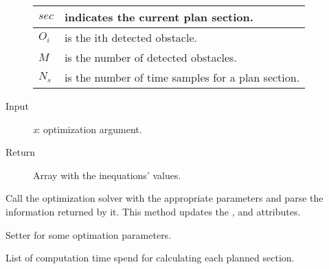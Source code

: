 \documentclass[letterpaper,10pt,english]{sphinxmanual}
\begin{document}
\begin{fulllineitems}
\begin{fulllineitems}
\begin{description}
\begin{tabulary}{\linewidth}{|L|L|}
\(sec\)
 & 
indicates the current plan section.
\\
\hline
\(O_i\)
 & 
is the ith detected obstacle.
\\
\hline
\(M\)
 & 
is the number of detected obstacles.
\\
\hline
\(N_s\)
 & 
is the number of time samples for a plan section.
\\
\hline\end{tabulary}


\item[{Input}] \leavevmode
\emph{x}: optimization argument.

\item[{Return}] \leavevmode
Array with the inequations' values.

\end{description}

\end{fulllineitems}


\begin{fulllineitems}
\label{Multi-robot motion planner:planning_sim.Robot._solve_opt_pbl}
Call the optimization solver with the appropriate parameters and parse
the information returned by it. This method updates the , 
and  attributes.

\end{fulllineitems}


\begin{fulllineitems}
\label{Multi-robot motion planner:planning_sim.Robot.set_option}
Setter for some optimation parameters.

\end{fulllineitems}


\begin{fulllineitems}
\label{Multi-robot motion planner:planning_sim.Robot.ctime}
List of computation time spend for calculating each planned section.

\end{fulllineitems}



\end{fulllineitems}
\end{document}
